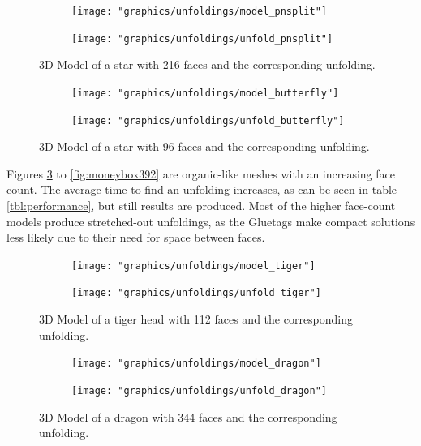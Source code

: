\documentclass[draft,final]{vutinfth} %
\begin{document}
\begin{figure}
  \begin{subfigure}[b]{0.475\textwidth}
    \texttt{[image: "graphics/unfoldings/model\_pnsplit"]}
  \end{subfigure}
  \begin{subfigure}[b]{0.475\textwidth}
    \texttt{[image: "graphics/unfoldings/unfold\_pnsplit"]}
  \end{subfigure}
  
  \caption{3D Model of a star with 216 faces and the corresponding unfolding.}
  \label{fig:pnsplit}
\end{figure}

\begin{figure}
  \begin{subfigure}[b]{0.475\textwidth}
    \texttt{[image: "graphics/unfoldings/model\_butterfly"]}
  \end{subfigure}
  \begin{subfigure}[b]{0.475\textwidth}
    \texttt{[image: "graphics/unfoldings/unfold\_butterfly"]}
  \end{subfigure}
  
  \caption{3D Model of a star with 96 faces and the corresponding unfolding.}
  \label{fig:butterfly}
\end{figure}

\newpage

Figures \ref{fig:tiger} to \ref{fig:moneybox392} are organic-like meshes with an increasing face count. The average time to find an unfolding increases, as can be seen in table \ref{tbl:performance}, but still results are produced. Most of the higher face-count models produce stretched-out unfoldings, as the Gluetags make compact solutions less likely due to their need for space between faces.

\begin{figure}
  \begin{subfigure}[b]{0.475\textwidth}
    \texttt{[image: "graphics/unfoldings/model\_tiger"]}
  \end{subfigure}
  \begin{subfigure}[b]{0.475\textwidth}
    \texttt{[image: "graphics/unfoldings/unfold\_tiger"]}
  \end{subfigure}
  
  \caption{3D Model of a tiger head with 112 faces and the corresponding unfolding.}
  \label{fig:tiger}
\end{figure}

\begin{figure}
  \begin{subfigure}[b]{0.475\textwidth}
    \texttt{[image: "graphics/unfoldings/model\_dragon"]}
  \end{subfigure}
  \begin{subfigure}[b]{0.475\textwidth}
    \texttt{[image: "graphics/unfoldings/unfold\_dragon"]}
  \end{subfigure}
  
  \caption{3D Model of a dragon with 344 faces and the corresponding unfolding.}
  \label{fig:dragon}
\end{figure}
\end{document}
